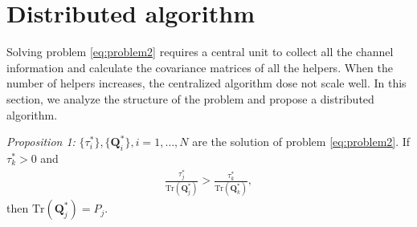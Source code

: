 \documentclass[journal]{IEEEtran}
\begin{document}

\section{Distributed algorithm} \label{sec:distributed algorithm}
Solving problem \eqref{eq:problem2} requires a central unit to collect all the channel information and calculate the covariance matrices of all the helpers. When the number of helpers increases, the centralized algorithm dose not scale well. 
In this section, we analyze the structure of the problem and propose a distributed algorithm. 

\emph{Proposition 1:} $\{\tau_i^*\}, \{\mathbf{Q}_i^*\}, i = 1, \ldots, N$ are the solution of problem \eqref{eq:problem2}. If $\tau_k^* > 0$ and
\begin{eqnarray}
\frac{\tau_j^*}{\mathrm{Tr}(\mathbf{Q}_j^*)} > \frac{\tau_k^*}{\mathrm{Tr}(\mathbf{Q}_k^*)} \label{eq:efficiency},
\end{eqnarray}
then $\mathrm{Tr}(\mathbf{Q}_j^*) = P_j$.
\end{document}
